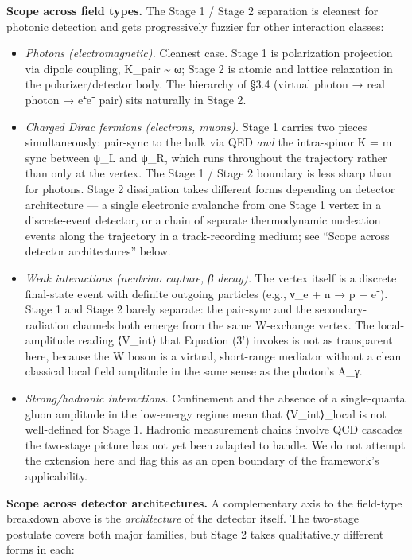 \documentclass[
]{article}
\providecommand{\tightlist}{%
  \setlength{\itemsep}{0pt}\setlength{\parskip}{0pt}}
\begin{document}
\textbf{Scope across field types.} The Stage 1 / Stage 2 separation is
cleanest for photonic detection and gets progressively fuzzier for other
interaction classes:

\begin{itemize}
\tightlist
\item
  \emph{Photons (electromagnetic).} Cleanest case. Stage 1 is
  polarization projection via dipole coupling, K\_pair \textasciitilde{}
  ω; Stage 2 is atomic and lattice relaxation in the polarizer/detector
  body. The hierarchy of §3.4 (virtual photon → real photon → e⁺e⁻ pair)
  sits naturally in Stage 2.
\item
  \emph{Charged Dirac fermions (electrons, muons).} Stage 1 carries two
  pieces simultaneously: pair-sync to the bulk via QED \emph{and} the
  intra-spinor K = m sync between ψ\_L and ψ\_R, which runs throughout
  the trajectory rather than only at the vertex. The Stage 1 / Stage 2
  boundary is less sharp than for photons. Stage 2 dissipation takes
  different forms depending on detector architecture --- a single
  electronic avalanche from one Stage 1 vertex in a discrete-event
  detector, or a chain of separate thermodynamic nucleation events along
  the trajectory in a track-recording medium; see ``Scope across
  detector architectures'' below.
\item
  \emph{Weak interactions (neutrino capture, β decay).} The vertex
  itself is a discrete final-state event with definite outgoing
  particles (e.g., ν\_e + n → p + e⁻). Stage 1 and Stage 2 barely
  separate: the pair-sync and the secondary-radiation channels both
  emerge from the same W-exchange vertex. The local-amplitude reading
  ⟨V\_int⟩ that Equation (3') invokes is not as transparent here,
  because the W boson is a virtual, short-range mediator without a clean
  classical local field amplitude in the same sense as the photon's
  A\_γ.
\item
  \emph{Strong/hadronic interactions.} Confinement and the absence of a
  single-quanta gluon amplitude in the low-energy regime mean that
  ⟨V\_int⟩\_local is not well-defined for Stage 1. Hadronic measurement
  chains involve QCD cascades the two-stage picture has not yet been
  adapted to handle. We do not attempt the extension here and flag this
  as an open boundary of the framework's applicability.
\end{itemize}

\textbf{Scope across detector architectures.} A complementary axis to
the field-type breakdown above is the \emph{architecture} of the
detector itself. The two-stage postulate covers both major families, but
Stage 2 takes qualitatively different forms in each:
\end{document}
